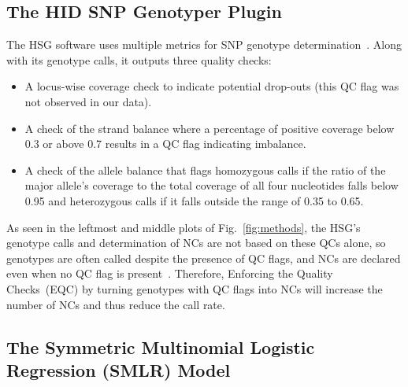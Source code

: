 \documentclass[preprint,5p,times,11pt]{elsarticle}
\begin{document}
\subsection{The HID SNP Genotyper Plugin}
The HSG software uses multiple metrics for SNP genotype determination~\cite[p.~35]{hid}.
Along with its genotype calls, it outputs three quality checks:
\begin{itemize}
\item A locus-wise coverage check to indicate potential drop-outs (this QC flag was not observed in our data).
\item A check of the strand balance where a percentage of positive coverage below 0.3 or above 0.7 results in a QC flag indicating imbalance.
\item A check of the allele balance that flags homozygous calls if the ratio of the major allele's coverage to the total coverage of all four nucleotides falls below 0.95 and heterozygous calls if it falls outside the range of 0.35 to 0.65.
\end{itemize}
As seen in the leftmost and middle plots of Fig.~\ref{fig:methods}, the HSG's genotype calls and determination of NCs are not based on these QCs alone, so genotypes are often called despite the presence of QC flags, and NCs are declared even when no QC flag is present~\cite[p.~35]{hid}.
Therefore, Enforcing the Quality Checks~(EQC) by turning genotypes with QC flags into NCs will increase the number of NCs and thus reduce the call rate.


\subsection{The Symmetric Multinomial Logistic Regression (SMLR) Model}
\end{document}
